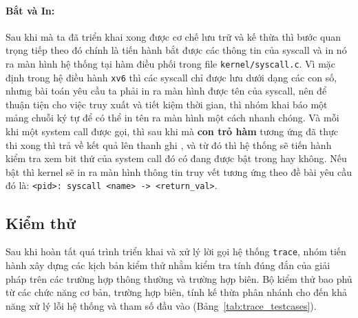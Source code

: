 \paragraph*{Bắt và In:} Sau khi mà ta đã triển khai xong được cơ chế
lưu trữ và kế thừa thì bước quan trọng tiếp theo đó chính là tiến hành
bắt được các thông tin của syscall và in nó ra màn hình hệ thống tại
hàm điều phối  trong file \texttt{kernel/syscall.c}.
Vì mặc định trong hệ điều hành \texttt{xv6} thì các syscall chỉ được lưu
dưới dạng các con số, nhưng bài toán yêu cầu ta phải in ra màn hình được
tên của syscall, nên để thuận tiện cho việc truy xuất và tiết kiệm thời 
gian, thì nhóm khai báo một mảng chuỗi ký tự  để
có thể in tên ra màn hình một cách nhanh chóng. Và mỗi khi một system call 
được gọi, thì sau khi mà \textbf{con trỏ hàm} tương ứng đã thực thi xong
thì trả về kết quả lên thanh ghi , và từ đó thì 
hệ thống sẽ tiến hành kiểm tra xem bit thứ  của system call 
đó có đang được bật trong  hay không. Nếu bật thì kernel
sẽ in ra màn hình thông tin truy vết tương ứng theo đề bài yêu cầu đó
là: \texttt{<pid>: syscall <name> -> <return\_val>}. 

\subsection{Kiểm thử}
Sau khi hoàn tất quá trình triển khai và xử lý lời gọi hệ thống \texttt{trace}, nhóm tiến hành xây dựng các kịch bản kiểm thử nhằm kiểm tra tính đúng đắn của giải pháp trên các trường hợp thông thường và trường hợp biên. Bộ kiểm thử bao phủ từ các chức năng cơ bản, trường hợp biên, tính kế thừa phân nhánh cho đến khả năng xử lý lỗi hệ thống và tham số đầu vào (Bảng~\ref{tab:trace_testcases}).

